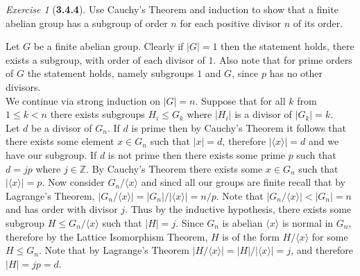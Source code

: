 \documentclass[12pt]{amsart}
\makeatletter
\theoremstyle{remark}
\newtheorem*{exercise}{Exercise}%
\def\ZZ{\ensuremath{\mathbb Z}}
\renewenvironment{proof}[1][\proofname]{\par\doublespacing
  \pushQED{\qed}%
  \normalfont \topsep6\p@\@plus6\p@\relax
  \list{}{%
    \settowidth{\leftmargin}{\itshape\proofname:\hskip\labelsep}%
    \setlength{\labelwidth}{0pt}%
    \setlength{\itemindent}{-\leftmargin}%
  }%
  \item[\hskip\labelsep\itshape#1\@addpunct{:}]\ignorespaces
}{%
  \popQED\endlist\@endpefalse
  \singlespacing
}
\theoremstyle{mycomment}
\makeatother
\begin{document}
\begin{exercise}[\textbf{3.4.4}] Use Cauchy's Theorem and induction to show that a finite abelian group has a subgroup of order $n$ for each positive divisor $n$ of its order.\\
  \begin{proof} Let $G$ be a finite abelian group. Clearly if $|G| = 1$ then the statement holds, there exists a subgroup, with order of each divisor of $1$. 
    Also note that for prime orders of $G$ the statement holds, namely subgroups $1$ and $G$, since $p$ has no other divisors.\\

    We continue via strong induction on $|G| = n$. Suppose that for all $k$ from $1 \leq k < n$ there exists subgroups $H_i \leq G_k$ where $|H_i|$ is 
    a divisor of $|G_k| = k$.\\
    Let $d$ be a divisor of $G_n$. If $d$ is prime then by Cauchy's Theorem it follows that there exists some element $x \in G_n$ such that $|x| = d$,
    therefore $|\langle x\rangle| = d$ and we have our subgroup. If $d$ is not prime then there exists some prime $p$ such that $d = jp$ where $j \in \ZZ$. 
    By Cauchy's Theorem there exists some $x \in G_n$ such that $|\langle x\rangle| = p$. Now consider $G_n/\langle x\rangle$ and sincd all our groups are finite recall that by Lagrange's Theorem, 
    $|G_n/\langle x\rangle| = |G_n|/|\langle x\rangle| = n/p$. Note that $|G_n/\langle x\rangle| < |G_n| = n$ and has order with divisor $j$. Thus by the inductive hypothesis, there exists some subgroup
    $H \leq G_n/\langle x\rangle$ such that $|H| = j$. Since $G_n$ is abelian $\langle x\rangle$ is normal in $G_n$, therefore by the Lattice Isomorphism Theorem, $H$ is of the form $H/\langle x\rangle$ for some $H \leq G_n$. Note that by Lagrange's Theorem $|H/\langle x\rangle| = |H|/|\langle x\rangle| = j$, and therefore $|H| = jp = d$.
  \end{proof}
\end{exercise}
\vspace{.15in}
\end{document}
